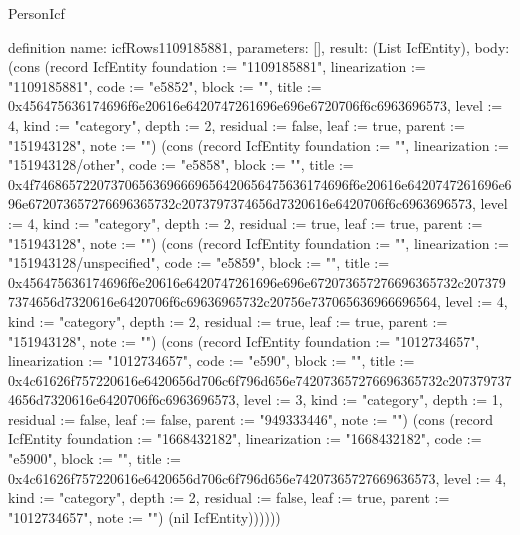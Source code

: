 \begin{lexlean}{PersonIcf}
\begin{semanticmodule}
definition{
  name: icfRows1109185881,
  parameters: [],
  result: (List IcfEntity),
  body: (cons (record IcfEntity {foundation := "1109185881", linearization := "1109185881", code := "e5852", block := "", title := 0x456475636174696f6e20616e6420747261696e696e6720706f6c6963696573, level := 4, kind := "category", depth := 2, residual := false, leaf := true, parent := "151943128", note := ""}) (cons (record IcfEntity {foundation := "", linearization := "151943128/other", code := "e5858", block := "", title := 0x4f746865722073706563696669656420656475636174696f6e20616e6420747261696e696e672073657276696365732c2073797374656d7320616e6420706f6c6963696573, level := 4, kind := "category", depth := 2, residual := true, leaf := true, parent := "151943128", note := ""}) (cons (record IcfEntity {foundation := "", linearization := "151943128/unspecified", code := "e5859", block := "", title := 0x456475636174696f6e20616e6420747261696e696e672073657276696365732c2073797374656d7320616e6420706f6c69636965732c20756e737065636966696564, level := 4, kind := "category", depth := 2, residual := true, leaf := true, parent := "151943128", note := ""}) (cons (record IcfEntity {foundation := "1012734657", linearization := "1012734657", code := "e590", block := "", title := 0x4c61626f757220616e6420656d706c6f796d656e742073657276696365732c2073797374656d7320616e6420706f6c6963696573, level := 3, kind := "category", depth := 1, residual := false, leaf := false, parent := "949333446", note := ""}) (cons (record IcfEntity {foundation := "1668432182", linearization := "1668432182", code := "e5900", block := "", title := 0x4c61626f757220616e6420656d706c6f796d656e74207365727669636573, level := 4, kind := "category", depth := 2, residual := false, leaf := true, parent := "1012734657", note := ""}) (nil IcfEntity))))))
}


\end{semanticmodule}
\end{lexlean}
